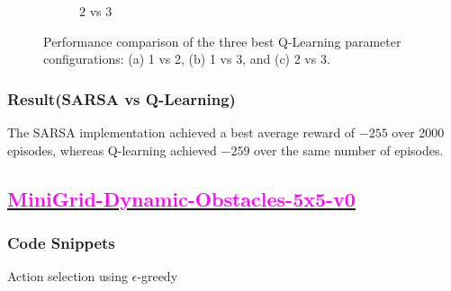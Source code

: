 \documentclass[11pt, a4]{article}
\begin{document}
\begin{figure}[H]
\begin{subfigure}{.8\textwidth}
						\caption{$2$ vs $3$}
						\label{fig:qlearningmountaincar2vs3}
					\end{subfigure}
					\caption{Performance comparison of the three best Q-Learning parameter configurations: (a) 1 vs 2, (b) 1 vs 3, and (c) 2 vs 3.}
					\label{fig:qlearningmountaincar}
				\end{figure}
			\subsubsection{Result(SARSA vs Q-Learning)}		
				The SARSA implementation achieved a best average reward of \(-255\) over 2000 episodes, whereas Q-learning achieved \(-259\) over the same number of episodes.
		\subsection{\href{https://github.com/RitabrataMandal/RL-DA6400-assignment_1/tree/main/minigrid_world}{\textcolor{magenta}{MiniGrid-Dynamic-Obstacles-5x5-v0}}}
			\subsubsection{Code Snippets}
				Action selection using $\epsilon$-greedy
				
				
				
				
\end{document}
